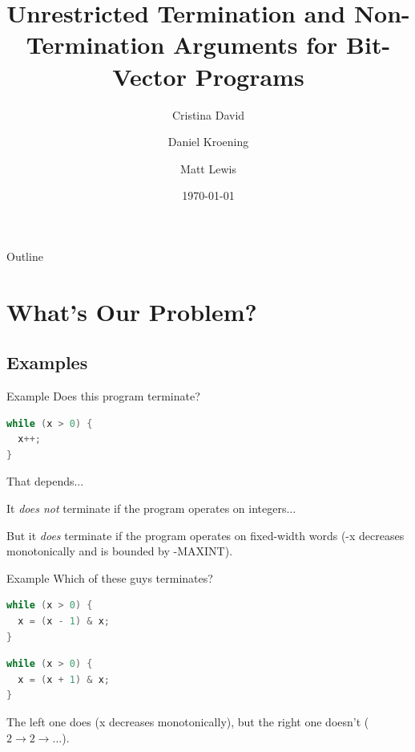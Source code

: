 \documentclass[xcolor=pdftex,t,11pt]{beamer}
\author{Cristina David \and Daniel Kroening \and Matt Lewis}
\title{Unrestricted Termination and Non-Termination Arguments for Bit-Vector Programs}
\institute{University of Oxford}
\date{\today}
\begin{document}

\begin{frame}[plain]
  \titlepage
\end{frame}

\begin{frame}{Outline}
  \tableofcontents
\end{frame}

\section{What's Our Problem?}
\subsection{Examples}

\begin{frame}[fragile]{Example}
Does this program terminate?
\begin{center}
\begin{minipage}{0.4\linewidth}
 \begin{lstlisting}[language=C,basicstyle=\normalsize]
while (x > 0) {
  x++;
}
 \end{lstlisting}
\end{minipage}
\end{center}

\pause

That depends...

It \emph{does not} terminate if the program operates on integers...

But it \emph{does} terminate if the program operates on fixed-width words
(-x decreases monotonically and is bounded by -MAXINT).

\end{frame}

\begin{frame}[fragile]{Example}
Which of these guys terminates?
\begin{center}
\begin{minipage}{0.45\linewidth}
 \begin{lstlisting}[language=C,basicstyle=\normalsize]
while (x > 0) {
  x = (x - 1) & x;
}
\end{lstlisting}
\end{minipage}
\begin{minipage}{0.45\linewidth}
 \begin{lstlisting}[language=C,basicstyle=\normalsize]
while (x > 0) {
  x = (x + 1) & x;
}
\end{lstlisting}
\end{minipage}
\end{center}

\pause

The left one does (x decreases monotonically), but the right one doesn't ($2 \rightarrow 2 \rightarrow \dots$).
\end{frame}
\end{document}
